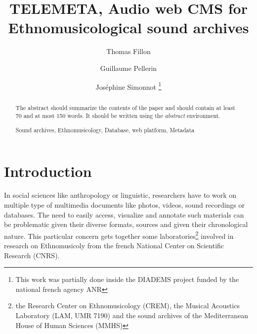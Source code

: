 \documentclass[runningheads,a4paper]{llncs}
\newcommand{\keywords}[1]{\par\addvspace\baselineskip
\noindent\keywordname\enspace\ignorespaces#1}
\begin{document}
\mainmatter  %

\title{TELEMETA, Audio web CMS for Ethnomusicological sound archives}


%
%
\author{Thomas Fillon \and Guillaume Pellerin
 \and Jos{\'e}phine Simonnot 
\thanks{This work was partially done inside the DIADEMS project funded by the national french agency ANR }
}
%


\maketitle

\setcounter{footnote}{0}


\begin{abstract}
The abstract should summarize the contents of the paper and should
contain at least 70 and at most 150 words. It should be written using the
\emph{abstract} environment.
\keywords{Sound archives, Ethnomusicology, Database, web platform, Metadata}
\end{abstract}


\section{Introduction}

In social sciences like anthropology or linguistic, researchers have to work on multiple type of multimedia documents like photos, videos, sound recordings or databases. The need to easily access, visualize and annotate such materials can be problematic given their diverse formats, sources and given their chronological nature.
This particular concern gets together some laboratories\footnote{the Research Center on Ethnomusicology (CREM), the Musical Acoustics Laboratory (LAM, UMR 7190) and the sound archives of the Mediterranean House of Human Sciences (MMHS)} involved in research on Ethnomusicoly from  the french National Center on Scientific Research (CNRS).
\end{document}
